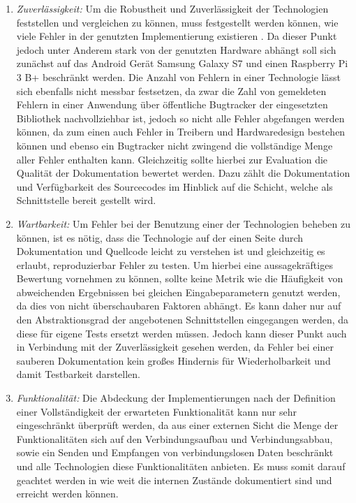    	\begin{enumerate}
    	\item {\it Zuverlässigkeit:} 
    	Um die Robustheit und Zuverlässigkeit der Technologien feststellen und vergleichen zu können, muss festgestellt werden können, wie viele Fehler in der genutzten Implementierung existieren \cite[S.9]{liggesmeyer}. Da dieser Punkt jedoch unter Anderem stark von der genutzten Hardware abhängt soll sich zunächst auf das Android Gerät Samsung Galaxy S7 und einen Raspberry Pi 3 B+ beschränkt werden. Die Anzahl von Fehlern in einer Technologie lässt sich ebenfalls nicht messbar festsetzen, da zwar die Zahl von gemeldeten Fehlern in einer Anwendung über öffentliche Bugtracker der eingesetzten Bibliothek nachvollziehbar ist, jedoch so nicht alle Fehler abgefangen werden können, da zum einen auch Fehler in Treibern und Hardwaredesign bestehen können und ebenso ein Bugtracker nicht zwingend die vollständige Menge aller Fehler enthalten kann. Gleichzeitig sollte hierbei zur Evaluation die Qualität der Dokumentation bewertet werden. Dazu zählt die Dokumentation und Verfügbarkeit des Sourcecodes im Hinblick auf die Schicht, welche als Schnittstelle bereit gestellt wird.
    	\item {\it Wartbarkeit:} Um Fehler bei der Benutzung einer der Technologien beheben zu können, ist es nötig, dass die Technologie auf der einen Seite durch Dokumentation und Quellcode leicht zu verstehen ist und gleichzeitig es erlaubt, reproduzierbar Fehler zu testen. Um hierbei eine aussagekräftiges Bewertung vornehmen zu können, sollte keine Metrik wie die Häufigkeit von abweichenden Ergebnissen bei gleichen Eingabeparametern genutzt werden, da dies von nicht überschaubaren Faktoren abhängt. Es kann daher nur auf den Abstraktionsgrad der angebotenen Schnittstellen eingegangen werden, da diese für eigene Tests ersetzt werden müssen. Jedoch kann dieser Punkt auch in Verbindung mit der Zuverlässigkeit gesehen werden, da Fehler bei einer sauberen Dokumentation kein großes Hindernis für Wiederholbarkeit und damit Testbarkeit darstellen.
    	\item {\it Funktionalität:}
    	Die Abdeckung der Implementierungen nach der Definition einer Vollständigkeit der erwarteten Funktionalität \cite[S.8]{liggesmeyer} kann nur sehr eingeschränkt überprüft werden, da aus einer externen Sicht die Menge der Funktionalitäten sich auf den Verbindungsaufbau und Verbindungsabbau, sowie ein Senden und Empfangen von verbindungslosen Daten beschränkt und alle Technologien diese Funktionalitäten anbieten. Es muss somit darauf geachtet werden in wie weit die internen Zustände dokumentiert sind und erreicht werden können.

\end{enumerate}
